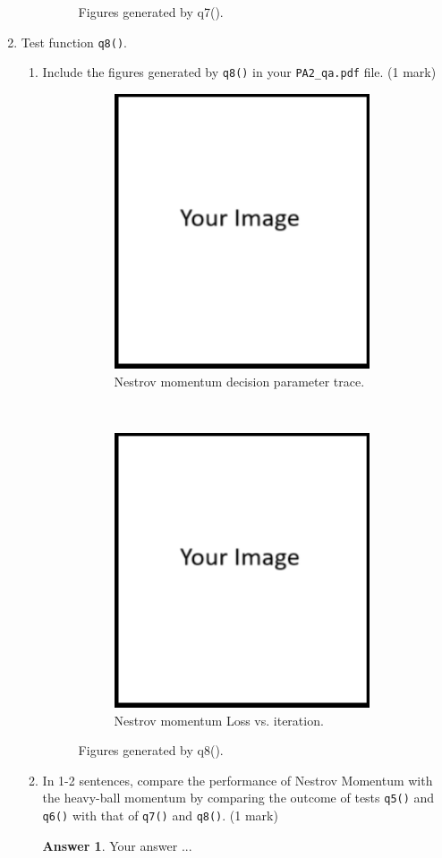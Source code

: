 \documentclass{article}
\theoremstyle{definition}
\newtheorem*{answer}{Answer}
\begin{document}
\begin{enumerate}[label=\ref{mom}.\alph*]
\begin{enumerate}[label=1.2.c.\roman*]
\begin{figure}[h]
\begin{subfigure}[t]{0.5\textwidth}
			\end{subfigure}
			\caption{Figures generated by q7().}
		\end{figure}
	\end{enumerate}
	\newpage
	\item Test function \verb|q8()|.
	\begin{enumerate}[label=1.2.d.\roman*]
		\item Include the figures generated by \verb|q8()| in your \verb|PA2_qa.pdf| file. (1 mark)
		\begin{figure}[h]
			\centering
			\begin{subfigure}[t]{0.5\textwidth}
				\centering
				\includegraphics[height=3.2in]{image.png}
				\caption{Nestrov momentum decision parameter trace.}
			\end{subfigure}%
			~ 
			\begin{subfigure}[t]{0.5\textwidth}
				\centering
				\includegraphics[height=3.2in]{image.png}
				\caption{Nestrov momentum Loss vs. iteration.}
			\end{subfigure}
			\caption{Figures generated by q8().}
		\end{figure}
		\item In 1-2 sentences, compare the performance of Nestrov Momentum with the heavy-ball momentum by comparing the outcome of tests \verb|q5()| and \verb|q6()| with that of \verb|q7()| and \verb|q8()|. (1 mark)
		\begin{answer}
			Your answer ...
		\end{answer}
	\end{enumerate}
\end{enumerate}
\end{document}
